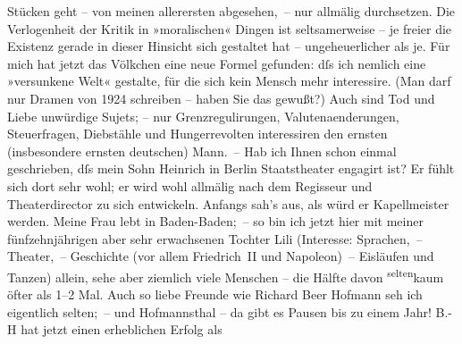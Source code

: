 \begin{ledgroupsized}[t]{13cm}
               Stücken geht – von meinen allerersten abgesehen, – nur allmälig durchsetzen. Die
               Verlogenheit der Kritik in »moralischen« Dingen ist seltsamerweise – je freier die
               Existenz gerade in dieser Hinsicht sich gestaltet hat – ungeheuerlicher als je. Für
               mich hat jetzt das Völkchen eine neue Formel gefunden: dſs ich nemlich eine
               »versunkene Welt« gestalte, für die sich kein Mensch mehr interessire. (Man darf nur
               Dramen von 1924 schreiben – haben Sie das gewußt?) Auch sind Tod und
               Liebe unwürdige Sujets; – nur Grenzregulirungen, Valutenaenderungen, Steuerfragen,
               Diebstähle und Hungerrevolten interessiren den {\pb}ernsten (insbesondere ernsten deutschen) Mann. –\pend
           \pstart
           Hab ich Ihnen schon einmal geschrieben, dſs mein Sohn Heinrich in Berlin Staatstheater engagirt
               ist? Er fühlt sich dort sehr wohl; er wird wohl allmälig nach dem Regisseur und
               Theaterdirector zu sich entwickeln. Anfangs sah's aus, als würd er Kapellmeister
               werden.\pend
           \pstart
           Meine Frau lebt in Baden-Baden; – so bin ich jetzt hier mit meiner
               fünfzehnjährigen aber sehr erwachsenen Tochter Lili (Interesse: Sprachen, – Theater, – Geschichte (vor allem Friedrich II und Napoleon) – Eisläufen und Tanzen) allein, sehe aber ziemlich viele Menschen
               – die Hälfte davon \substVorne{}\textsuperscript{selten}{\allowbreak}\substDazwischen{}kaum\substHinten{} öfter als 1–2 Mal. Auch so liebe Freunde wie Richard Beer Hofmann seh ich eigentlich selten; – und Hofmannsthal – da gibt es Pausen bis zu einem Jahr! B.-H hat jetzt einen erheblichen Erfolg als

\end{ledgroupsized}
